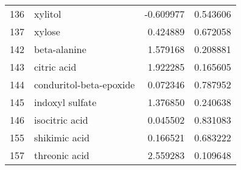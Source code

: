 \begin{tabular}{llrr}
136 &                            xylitol & -0.609977 &  0.543606 \\
137 &                             xylose &  0.424889 &  0.672058 \\
142 &                       beta-alanine &  1.579168 &  0.208881 \\
143 &                        citric acid &  1.922285 &  0.165605 \\
144 &            conduritol-beta-epoxide &  0.072346 &  0.787952 \\
145 &                    indoxyl sulfate &  1.376850 &  0.240638 \\
146 &                     isocitric acid &  0.045502 &  0.831083 \\
155 &                      shikimic acid &  0.166521 &  0.683222 \\
157 &                      threonic acid &  2.559283 &  0.109648 \\
\bottomrule
\end{tabular}
